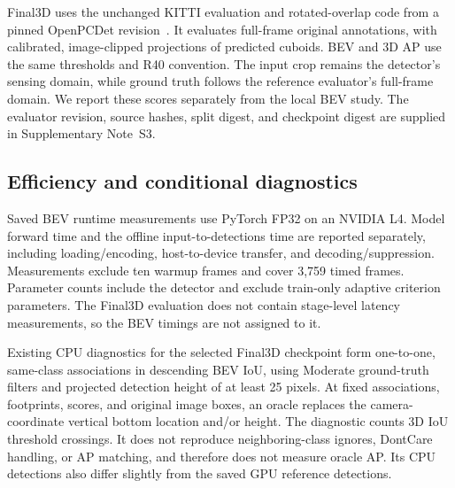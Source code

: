 Final3D uses the unchanged KITTI evaluation and rotated-overlap code from a pinned OpenPCDet revision~\cite{openpcdet}. It evaluates full-frame original annotations, with calibrated, image-clipped projections of predicted cuboids. BEV and 3D AP use the same thresholds and R40 convention. The input crop remains the detector's sensing domain, while ground truth follows the reference evaluator's full-frame domain. We report these scores separately from the local BEV study. The evaluator revision, source hashes, split digest, and checkpoint digest are supplied in Supplementary Note~S3.

\subsection{Efficiency and conditional diagnostics}
Saved BEV runtime measurements use PyTorch FP32 on an NVIDIA L4. Model forward time and the offline input-to-detections time are reported separately, including loading/encoding, host-to-device transfer, and decoding/suppression. Measurements exclude ten warmup frames and cover 3,759 timed frames. Parameter counts include the detector and exclude train-only adaptive criterion parameters. The Final3D evaluation does not contain stage-level latency measurements, so the BEV timings are not assigned to it.

Existing CPU diagnostics for the selected Final3D checkpoint form one-to-one, same-class associations in descending BEV IoU, using Moderate ground-truth filters and projected detection height of at least 25 pixels. At fixed associations, footprints, scores, and original image boxes, an oracle replaces the camera-coordinate vertical bottom location and/or height. The diagnostic counts 3D IoU threshold crossings. It does not reproduce neighboring-class ignores, DontCare handling, or AP matching, and therefore does not measure oracle AP. Its CPU detections also differ slightly from the saved GPU reference detections.
